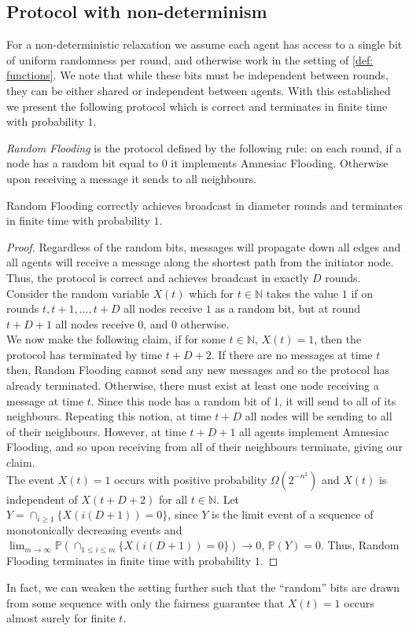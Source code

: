 \subsection{Protocol with non-determinism}
For a non-deterministic relaxation we assume each agent has access to a single bit of uniform randomness per round, and otherwise work in the setting of \cref{def: functions}.
We note that while these bits must be independent between rounds, they can be either shared or independent between agents.
With this established we present the following protocol which is correct and terminates in finite time with probability $1$.
\begin{definition}
    \emph{Random Flooding} is the protocol defined by the following rule: on each round, if a node has a random bit equal to $0$ it implements Amnesiac Flooding. Otherwise upon receiving a message it sends to all neighbours.
\end{definition}
\begin{proposition}
    Random Flooding correctly achieves broadcast in diameter rounds and terminates in finite time with probability $1$.
\end{proposition}
\begin{proof}
    Regardless of the random bits, messages will propagate down all edges and all agents will receive a message along the shortest path from the initiator node.
    Thus, the protocol is correct and achieves broadcast in exactly $D$ rounds.\\
    Consider the random variable $X(t)$ which for $t \in \mathbb{N}$ takes the value $1$ if on rounds $t, t+1,...,t+D$ all nodes receive $1$ as a random bit, but at round $t+D+1$ all nodes receive $0$, and $0$ otherwise.\\
    We now make the following claim, if for some $t \in \mathbb{N}$, $X(t)=1$, then the protocol has terminated by time $t+D+2$. 
    If there are no messages at time $t$ then, Random Flooding cannot send any new messages and so the protocol has already terminated.
    Otherwise, there must exist at least one node receiving a message at time $t$.
    Since this node has a random bit of $1$, it will send to all of its neighbours.
    Repeating this notion, at time $t+D$ all nodes will be sending to all of their neighbours.
    However, at time $t+D+1$ all agents implement Amnesiac Flooding, and so upon receiving from all of their neighbours terminate, giving our claim.\\
    The event $X(t)=1$ occurs with positive probability $\Omega(2^{-n^2})$ and $X(t)$ is independent of $X(t+D+2)$ for all $t \in \mathbb{N}$.
    Let $Y=\cap_{i\geq 1}\{X(i(D+1))=0\}$, since $Y$ is the limit event of a sequence of monotonically decreasing events and $\lim_{m\to\infty}\mathbb{P}(\cap_{1\leq i \leq m}\{X(i(D+1))=0\})\to 0$, $\mathbb{P}(Y)=0$.
    Thus, Random Flooding terminates in finite time with probability $1$.
\end{proof}
In fact, we can weaken the setting further such that the ``random'' bits are drawn from some sequence with only the fairness guarantee that $X(t)=1$ occurs almost surely for finite $t$.
